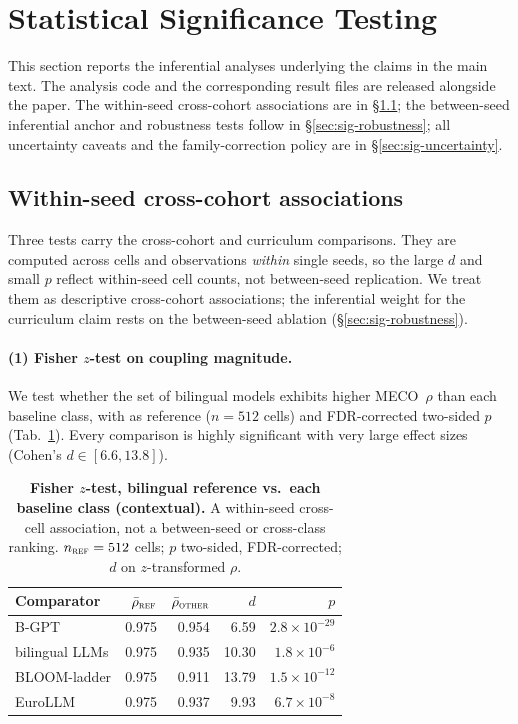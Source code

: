  
\section{Statistical Significance Testing}\label{sec:significance-comprehensive}
 
This section reports the inferential analyses underlying the claims in the main text. The analysis code and the corresponding result files are released alongside the paper. The within-seed cross-cohort associations are in \S\ref{sec:sig-core}; the between-seed inferential anchor and robustness tests follow in \S\ref{sec:sig-robustness}; all uncertainty caveats and the family-correction policy are in \S\ref{sec:sig-uncertainty}.
 
\subsection{Within-seed cross-cohort associations}\label{sec:sig-core}
 
Three tests carry the cross-cohort and curriculum comparisons. They are computed across cells and observations \emph{within} single seeds, so the large $d$ and small $p$ reflect within-seed cell counts, not between-seed replication. We treat them as descriptive cross-cohort associations; the inferential weight for the curriculum claim rests on the between-seed ablation (\S\ref{sec:sig-robustness}).
 
\paragraph{(1) Fisher $z$-test on coupling magnitude.} We test whether the set of \beetle{} bilingual models exhibits higher MECO~$\rho$ than each baseline class, with \beetle{} as reference ($n=512$ cells) and FDR-corrected two-sided $p$ (Tab.~\ref{tab:sig_fisher}). Every comparison is highly significant with very large effect sizes (Cohen's $d\in[6.6,13.8]$).
 
\begin{table}[!ht]
  \centering \small
  \caption{\textbf{Fisher $z$-test, \beetle{} bilingual reference vs.\ each baseline class (contextual).} A within-seed cross-cell association, not a between-seed or cross-class ranking. $n_\textsc{ref}=512$ cells; $p$ two-sided, FDR-corrected; $d$ on $z$-transformed $\rho$.}
  \label{tab:sig_fisher}
  \begin{tabular}{lrrrr}
    \toprule
    Comparator & $\bar\rho_\textsc{ref}$ & $\bar\rho_\textsc{other}$ & $d$ & $p$ \\
    \midrule
    B-GPT           & 0.975 & 0.954 & 6.59  & $2.8{\times}10^{-29}$ \\
    bilingual LLMs  & 0.975 & 0.935 & 10.30 & $1.8{\times}10^{-6}$ \\
    BLOOM-ladder    & 0.975 & 0.911 & 13.79 & $1.5{\times}10^{-12}$ \\
    EuroLLM         & 0.975 & 0.937 & 9.93  & $6.7{\times}10^{-8}$ \\
    \bottomrule
  \end{tabular}
\end{table}
 

